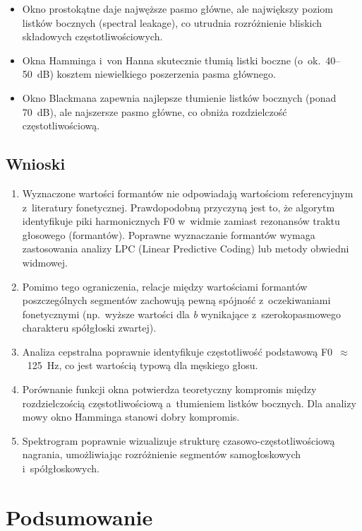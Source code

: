 \documentclass[a4paper,12pt]{article}
\begin{document}
\begin{itemize}
	\item Okno prostokątne daje najwęższe pasmo główne, ale największy poziom listków bocznych (spectral leakage), co utrudnia rozróżnienie bliskich składowych częstotliwościowych.
	\item Okna Hamminga i~von Hanna skutecznie tłumią listki boczne (o~ok.\ 40--50~dB) kosztem niewielkiego poszerzenia pasma głównego.
	\item Okno Blackmana zapewnia najlepsze tłumienie listków bocznych (ponad 70~dB), ale najszersze pasmo główne, co obniża rozdzielczość częstotliwościową.
\end{itemize}

\subsection{Wnioski}

\begin{enumerate}
	\item Wyznaczone wartości formantów nie odpowiadają wartościom referencyjnym z~literatury fonetycznej. Prawdopodobną przyczyną jest to, że algorytm identyfikuje piki harmonicznych F0 w~widmie zamiast rezonansów traktu głosowego (formantów). Poprawne wyznaczanie formantów wymaga zastosowania analizy LPC (Linear Predictive Coding) lub metody obwiedni widmowej.
	\item Pomimo tego ograniczenia, relacje między wartościami formantów poszczególnych segmentów zachowują pewną spójność z~oczekiwaniami fonetycznymi (np.\ wyższe wartości dla \textit{b} wynikające z~szerokopasmowego charakteru spółgłoski zwartej).
	\item Analiza cepstralna poprawnie identyfikuje częstotliwość podstawową F0~$\approx$~125~Hz, co jest wartością typową dla męskiego głosu.
	\item Porównanie funkcji okna potwierdza teoretyczny kompromis między rozdzielczością częstotliwościową a~tłumieniem listków bocznych. Dla analizy mowy okno Hamminga stanowi dobry kompromis.
	\item Spektrogram poprawnie wizualizuje strukturę czasowo-częstotliwościową nagrania, umożliwiając rozróżnienie segmentów samogłoskowych i~spółgłoskowych.
\end{enumerate}

\section{Podsumowanie}
\end{document}
